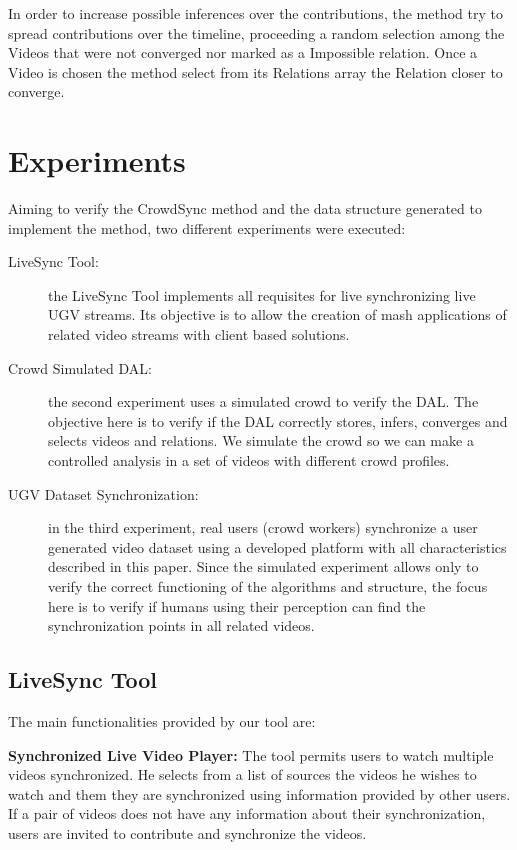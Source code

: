 \documentclass[sigconf]{acmart}
\begin{document}
In order to increase possible inferences over the contributions, the method try to spread contributions over the timeline, proceeding a random selection among the Videos that were not converged nor marked as a Impossible relation. Once a Video is chosen the method select from its Relations array the Relation closer to converge.

\section{Experiments}
Aiming to verify the CrowdSync method and the data structure generated to implement the method, two different experiments were executed:

\begin{description}
	\item[LiveSync Tool:] the LiveSync Tool implements all requisites for live synchronizing live UGV streams. Its objective is to allow the creation of mash applications of related video streams with client based solutions.
	\item[Crowd Simulated DAL:] the second experiment uses a simulated crowd to verify the DAL. The objective here is to verify if the DAL correctly stores, infers, converges and selects videos and relations. We simulate the crowd so we can make a controlled analysis in a set of videos with different crowd profiles.
	\item[UGV Dataset Synchronization:] in the third experiment, real users (crowd workers) synchronize a user generated video dataset using a developed platform with all characteristics described in this paper. Since the simulated experiment allows only to verify the correct functioning of the algorithms and structure, the focus here is to verify if humans using their perception can find the synchronization points in all related videos.
\end{description}

\subsection{LiveSync Tool}
\label{livesync}
The main functionalities provided by our tool are:

\textbf{Synchronized Live Video Player:} The tool permits users to watch multiple videos synchronized. He selects from a list of sources the videos he wishes to watch and them they are synchronized using information provided by other users. If a pair of videos does not have any information about their synchronization, users are invited to contribute and synchronize the videos.
\end{document}

